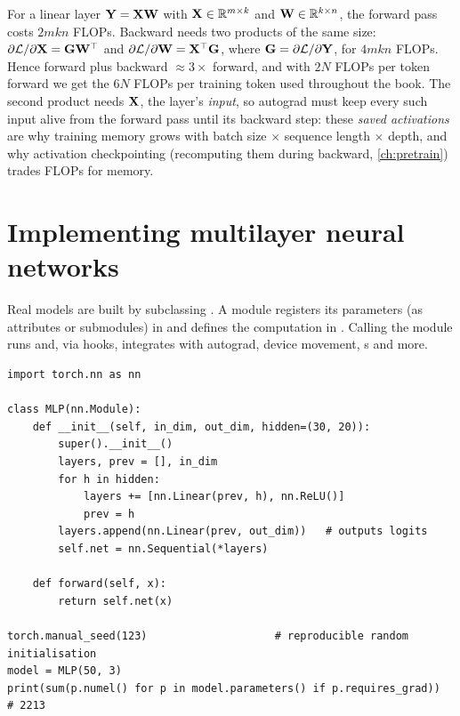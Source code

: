 \begin{systemslens}
For a linear layer $\mathbf{Y}=\mathbf{X}\mathbf{W}$ with $\mathbf{X}\in\mathbb{R}^{m\times k}$ and $\mathbf{W}\in\mathbb{R}^{k\times n}$, the
forward pass costs $2mkn$ FLOPs. Backward needs two products of the same size:
$\partial\mathcal{L}/\partial\mathbf{X}=\mathbf{G}\mathbf{W}^\top$ and $\partial\mathcal{L}/\partial\mathbf{W}=\mathbf{X}^\top\mathbf{G}$,
where $\mathbf{G}=\partial\mathcal{L}/\partial\mathbf{Y}$, for $4mkn$ FLOPs. Hence forward plus backward
$\approx 3\times$ forward, and with $2N$ FLOPs per token forward we get the $6N$ FLOPs per training token used
throughout the book. The second product needs $\mathbf{X}$, the layer's \emph{input}, so autograd must keep
every such input alive from the forward pass until its backward step: these \emph{saved activations} are why
training memory grows with batch size $\times$ sequence length $\times$ depth, and why activation
checkpointing (recomputing them during backward, \cref{ch:pretrain}) trades FLOPs for memory.
\end{systemslens}

\section{Implementing multilayer neural networks}\label{sec:pytorch:mlp}

Real models are built by subclassing . A module registers its parameters (as
 attributes or submodules) in  and defines the computation in
. Calling the module runs  and, via hooks, integrates with autograd, device
movement, s and more.

\begin{lstlisting}[caption={A multilayer perceptron as an \texttt{nn.Module}.},label={lst:pytorch:mlp}]
import torch.nn as nn

class MLP(nn.Module):
    def __init__(self, in_dim, out_dim, hidden=(30, 20)):
        super().__init__()
        layers, prev = [], in_dim
        for h in hidden:
            layers += [nn.Linear(prev, h), nn.ReLU()]
            prev = h
        layers.append(nn.Linear(prev, out_dim))   # outputs logits
        self.net = nn.Sequential(*layers)

    def forward(self, x):
        return self.net(x)

torch.manual_seed(123)                    # reproducible random initialisation
model = MLP(50, 3)
print(sum(p.numel() for p in model.parameters() if p.requires_grad))   # 2213
\end{lstlisting}

